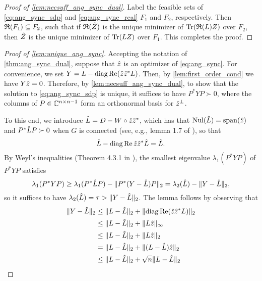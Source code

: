 \begin{proof}[Proof of \cref{lem:necsuff_ang_sync_dual}]
  Label the feasible sets of \eqref{eq:ang_sync_sdp} and \eqref{eq:ang_sync_real} $F_1$ and $F_2$, respectively.  Then $\mathfrak{R}(F_1) \subseteq F_2$, such that if $\mathfrak{R}(\hat{Z})$ is the unique minimizer of $\operatorname{Tr}(\mathfrak{R}(L) Z)$ over $F_2$, then $\hat{Z}$ is the unique minimizer of $\operatorname{Tr}(L Z)$ over $F_1$.  This completes the proof.
\end{proof}

\begin{proof}[Proof of \cref{lem:unique_ang_sync}]
  Accepting the notation of \cref{thm:ang_sync_dual}, suppose that $\hat{z}$ is an optimizer of \eqref{eq:ang_sync}.  For convenience, we set $Y = L - \operatorname{diag} \operatorname{Re} (\hat{z} \hat{z}^* L)$.  Then, by \cref{lem:first_order_cond} we have $Y \hat{z} = 0$.  Therefore, by \cref{lem:necsuff_ang_sync_dual}, to show that the solution to \eqref{eq:ang_sync_sdp} is unique, it suffices to have $P^* Y P \succ 0$, where the columns of $P \in \mathbb{C}^{n \times n - 1}$ form an orthonormal basis for $\hat{z}^\perp$.

  To this end, we introduce $\hat{L} = D - W \circ \hat{z} \hat{z}^*$, which has that $\operatorname{Nul}(\hat{L}) = \operatorname{span}(\hat{z})$ and $P^* \hat{L} P \succ 0$ when $G$ is connected (see, e.g., lemma 1.7 of \cite{chungspectral}), so that \[\hat{L} - \operatorname{diag} \operatorname{Re} \hat{z} \hat{z}^* \hat{L} = \hat{L}.\]  By Weyl's inequalities (Theorem 4.3.1 in \cite{horn2012matrix}), the smallest eigenvalue $\lambda_1(P^* Y P)$ of $P^* Y P$ satisfies \[\lambda_1(P^* Y P) \ge \lambda_1(P^* \hat{L} P) - \lVert P^* (Y - \hat{L}) P\rVert_2 = \lambda_2(\hat{L}) - \lVert Y - \hat{L}\rVert_2,\] so it suffices to have $\lambda_2(\hat{L}) = \tau > \lVert Y - \hat{L}\rVert_2$.  The lemma follows by observing that
  \begin{align*}
    \lVert Y - \hat{L}\rVert_2 &\le \lVert L - \hat{L}\rVert_2 + \lVert \operatorname{diag}\operatorname{Re}(\hat{z} \hat{z}^* L)\rVert_2 \\
    &\le \lVert L - \hat{L}\rVert_2 + \lVert L \hat{z}\rVert_\infty \\
    &\le \lVert L - \hat{L}\rVert_2 + \lVert L \hat{z}\rVert_2 \\
    &=   \lVert L - \hat{L}\rVert_2 + \lVert (L - \hat{L}) \hat{z}\rVert_2 \\
    &\le \lVert L - \hat{L}\rVert_2 + \sqrt{n} \lVert L - \hat{L}\rVert_2
  \end{align*}
\end{proof}

